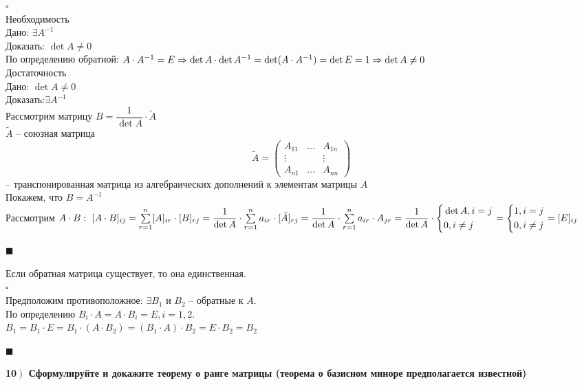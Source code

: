 \documentclass[a4paper,12pt]{article}
\newcommand*{\hm}[1]{#1\nobreak\discretionary{}
	{\hbox{$\mathsurround=0pt #1$}}{}}
\begin{document}
$\square$\\
Необходимость\\
Дано: $\exists A^{-1}$\\
Доказать: $\det A\ne0$\\
По определению обратной: $A\cdot A^{-1}=E\Rightarrow\det A\cdot\det A^{-1}=\det(A\cdot A^{-1})\hm{=}\det E=1\Rightarrow\det A\ne0$\\
Достаточность\\
Дано: $\det A\ne0$\\
Доказать:$\exists A^{-1}$\\
Рассмотрим матрицу $B=\dfrac{1}{\det A}\cdot \tilde A$\\
$\tilde A$ -- союзная матрица\\
\[
\tilde A=\begin{pmatrix}
A_{11}&\ldots&A_{1n}\\
\vdots&&\vdots\\
A_{n1}&\ldots&A_{nn}
\end{pmatrix}
\]
-- транспонированная матрица из алгебраических дополнений к элементам матрицы $A$\\
Покажем, что $B=A^{-1}$\\
Рассмотрим $A\cdot B: \text{ } [A\cdot B]_{ij}=\sum\limits_{r=1}^n [A]_{ir}\cdot [B]_{rj}=\dfrac{1}{\det A}\cdot \sum\limits_{r=1}^n a_{ir}\cdot[\tilde A]_{rj}\hm{=}\dfrac{1}{\det A}\cdot\sum\limits_{r=1}^n a_{ir}\cdot A_{jr}\hm{=}\dfrac{1}{\det A}\cdot\left\{
\begin{aligned}
&\det A, i=j\\
&0, i\ne j
\end{aligned}\right.=\left\{
\begin{aligned}
&1, i=j\\
&0, i\ne j
\end{aligned}\right.=[E]_{ij}$
\begin{flushright}
	$\blacksquare$
\end{flushright}
Если обратная матрица существует, то она единственная.\\
$\square$\\
Предположим противоположное: $\exists B_1$ и $B_2$ -- обратные к $A$.\\ По определению $B_i\cdot A=A\cdot B_i=E, i=1,2.$\\
$B_1=B_1\cdot E=B_1\cdot(A\cdot B_2)=(B_1\cdot A)\cdot B_2=E\cdot B_2=B_2$
\begin{flushright}
	$\blacksquare$
\end{flushright}
\textbf{10$\left.\right)$ Сформулируйте и докажите теорему о ранге матрицы (теорема о базисном миноре предполагается известной)}\\
\end{document}
